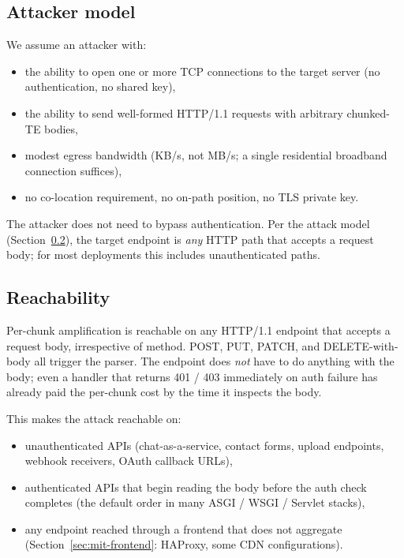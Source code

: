 \subsection{Attacker model}
\label{sec:tm-model}

We assume an attacker with:

\begin{itemize}
  \item the ability to open one or more TCP connections to the
    target server (no authentication, no shared key),
  \item the ability to send well-formed HTTP/1.1 requests with
    arbitrary chunked-TE bodies,
  \item modest egress bandwidth (KB/s, not MB/s; a single
    residential broadband connection suffices),
  \item no co-location requirement, no on-path position, no TLS
    private key.
\end{itemize}

The attacker does not need to bypass authentication. Per the
attack model (Section~\ref{sec:tm-reach}), the target endpoint is
\emph{any} HTTP path that accepts a request body; for most
deployments this includes unauthenticated paths.

\subsection{Reachability}
\label{sec:tm-reach}

Per-chunk amplification is reachable on any HTTP/1.1 endpoint that
accepts a request body, irrespective of method. POST, PUT, PATCH,
and DELETE-with-body all trigger the parser. The endpoint does
\emph{not} have to do anything with the body; even a handler that
returns 401 / 403 immediately on auth failure has already paid the
per-chunk cost by the time it inspects the body.

This makes the attack reachable on:

\begin{itemize}
  \item unauthenticated APIs (chat-as-a-service, contact forms,
    upload endpoints, webhook receivers, OAuth callback URLs),
  \item authenticated APIs that begin reading the body before the
    auth check completes (the default order in many ASGI / WSGI /
    Servlet stacks),
  \item any endpoint reached through a frontend that does not
    aggregate (Section~\ref{sec:mit-frontend}: HAProxy, some CDN
    configurations).
\end{itemize}

